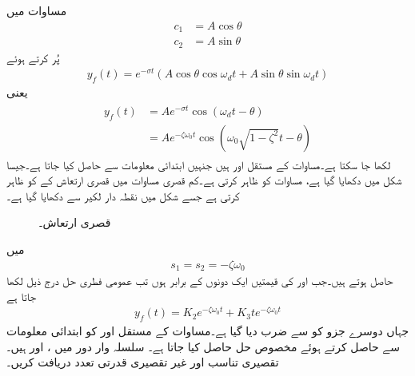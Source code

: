 مساوات  میں
\begin{align*}
c_1&=A \cos \theta\\
c_2&=A\sin \theta
\end{align*}
پُر کرتے ہوئے
\begin{align*}
y_f(t)=e^{-\sigma t} \left(A \cos \theta \cos \omega_d t +A \sin \theta \sin \omega_d t\right)
\end{align*}
یعنی
\begin{gather}
\begin{aligned}\label{مساوات_عارضی_فطری_حل_کم_تقصیر_ب}
y_f(t)&=Ae^{-\sigma t} \cos(\omega_d t -\theta)\\
&=Ae^{-\zeta \omega_0 t} \cos(\omega_0 \sqrt{1-\zeta^2} t-\theta)
\end{aligned}
\end{gather}
لکھا جا سکتا ہے۔مساوات  کے مستقل  اور  ہیں جنہیں ابتدائی معلومات سے حاصل کیا جاتا ہے۔جیسا شکل  میں دکھایا گیا ہے، مساوات    کو ظاہر کرتی ہے۔کم قصری مساوات میں  قصری ارتعاش کے  کو ظاہر کرتی ہے جسے شکل میں نقطہ دار لکیر سے  دکھایا گیا ہے۔
\begin{figure}
\centering
\pgfplotsset{scaled x ticks=false,scaled y ticks=false}
%
\caption{قصری ارتعاش۔}
\label{شکل_عارضی_کم_قصری_فطری_حل}
\end{figure}
  میں
\begin{align}
s_1=s_2=-\zeta \omega_0
\end{align}
حاصل ہوتے ہیں۔جب  اور  کی قیمتیں ایک دونوں کے برابر  ہوں تب عمومی فطری حل درج ذیل لکھا جاتا ہے
\begin{align}\label{مساوات_عارضی_فطری_فاصل_مقصور_حل}
y_f(t)=K_2 e^{-\zeta \omega_0 t}+K_3 t e^{-\zeta \omega_0 t}
\end{align}
جہاں دوسرے جزو کو  سے ضرب دیا گیا ہے۔مساوات کے مستقل  اور  کو ابتدائی معلومات سے حاصل کرتے ہوئے مخصوص حل حاصل کیا جاتا ہے۔
سلسلہ وار  دور میں ،  اور  ہیں۔تقصیری تناسب اور غیر تقصیری قدرتی تعدد دریافت کریں۔

